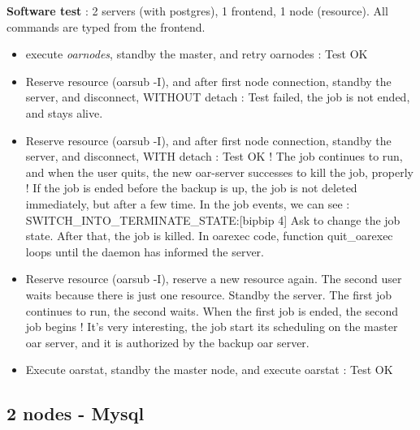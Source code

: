 \documentclass[a4paper,10pt]{report}
\begin{document}
\textbf{Software test} : 2 servers (with postgres), 1 frontend, 1 node (resource). All commands are typed from the frontend.
\begin{itemize}
 \item execute \textit{oarnodes}, standby the master, and retry oarnodes : Test OK
 \item Reserve resource (oarsub -I), and after first node connection, standby the server, and disconnect, WITHOUT detach : Test failed, the job is not ended, and stays alive.
 \item Reserve resource (oarsub -I), and after first node connection, standby the server, and disconnect, WITH detach : Test OK ! The job continues to run, and when the user quits, the new oar-server successes to kill the job, properly !
If the job is ended before the backup is up, the job is not deleted immediately, but after a few time. In the job events, we  can see : SWITCH\_INTO\_TERMINATE\_STATE:[bipbip 4] Ask to change the job state. After that, the job is killed.
In oarexec code, function quit\_oarexec loops until the daemon has informed the server.
 \item Reserve resource (oarsub -I), reserve a new resource again. The second user waits because there is just one resource. Standby the server. The first job continues to run, the second waits. When the first job is ended, the second job begins ! It's very interesting, the job start its scheduling on the master oar server, and it is authorized  by the backup oar server.
 \item Execute oarstat, standby the master node, and execute oarstat : Test OK
\end{itemize}


\subsection{2 nodes - Mysql}
\end{document}
